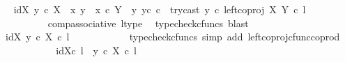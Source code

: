 \begin{isabellebody}
\ \isamarkupfalse%
\ {\isachardoublequoteopen}{\isachardot}{\kern0pt}{\isachardot}{\kern0pt}{\isachardot}{\kern0pt}\ {\isacharequal}{\kern0pt}\ {\isacharparenleft}{\kern0pt}{\isasymlangle}id{\isacharparenleft}{\kern0pt}X{\isacharparenright}{\kern0pt}{\isacharcomma}{\kern0pt}\ y{}\ {\isasymcirc}\isactrlsub c\ {\isasymbeta}\isactrlbsub X\isactrlesub {\isasymrangle}\ {\isasymamalg}\ {\isacharparenleft}{\kern0pt}{\isacharparenleft}{\kern0pt}{\isasymlangle}x{}{\isacharcomma}{\kern0pt}\ y{}{\isasymrangle}\ {\isasymamalg}\ {\isasymlangle}x{}\ {\isasymcirc}\isactrlsub c\ {\isasymbeta}\isactrlbsub Y\ {\isasymsetminus}\ {\isacharparenleft}{\kern0pt}{\isasymone}{\isacharcomma}{\kern0pt}y{}{\isacharparenright}{\kern0pt}\isactrlesub {\isacharcomma}{\kern0pt}\ y{}\isactrlsup c{\isasymrangle}{\isacharparenright}{\kern0pt}\ {\isasymcirc}\isactrlsub c\ \ try{\isacharunderscore}{\kern0pt}cast\ y{}{\isacharparenright}{\kern0pt}\ {\isasymcirc}\isactrlsub c\ left{\isacharunderscore}{\kern0pt}coproj\ X\ Y{\isacharparenright}{\kern0pt}\ {\isasymcirc}\isactrlsub c\ l{\isachardoublequoteclose}\isanewline
\ \ \ \ \ \ \ \ \ \ \isamarkupfalse%
\ comp{\isacharunderscore}{\kern0pt}associative{}\ l{\isacharunderscore}{\kern0pt}type\ \isamarkupfalse%
\ {\isacharparenleft}{\kern0pt}typecheck{\isacharunderscore}{\kern0pt}cfuncs{\isacharcomma}{\kern0pt}\ blast{\isacharparenright}{\kern0pt}\isanewline
\ \ \ \ \ \ \ \ \isamarkupfalse%
\ \isamarkupfalse%
\ {\isachardoublequoteopen}{\isachardot}{\kern0pt}{\isachardot}{\kern0pt}{\isachardot}{\kern0pt}\ {\isacharequal}{\kern0pt}\ {\isasymlangle}id{\isacharparenleft}{\kern0pt}X{\isacharparenright}{\kern0pt}{\isacharcomma}{\kern0pt}\ y{}\ {\isasymcirc}\isactrlsub c\ {\isasymbeta}\isactrlbsub X\isactrlesub {\isasymrangle}\ {\isasymcirc}\isactrlsub c\ l{\isachardoublequoteclose}\isanewline
\ \ \ \ \ \ \ \ \ \ \isamarkupfalse%
\ {\isacharparenleft}{\kern0pt}typecheck{\isacharunderscore}{\kern0pt}cfuncs{\isacharcomma}{\kern0pt}\ simp\ add{\isacharcolon}{\kern0pt}\ left{\isacharunderscore}{\kern0pt}coproj{\isacharunderscore}{\kern0pt}cfunc{\isacharunderscore}{\kern0pt}coprod{\isacharparenright}{\kern0pt}\isanewline
\ \ \ \ \ \ \ \ \isamarkupfalse%
\ \isamarkupfalse%
\ {\isachardoublequoteopen}{\isachardot}{\kern0pt}{\isachardot}{\kern0pt}{\isachardot}{\kern0pt}\ {\isacharequal}{\kern0pt}\ {\isasymlangle}id{\isacharparenleft}{\kern0pt}X{\isacharparenright}{\kern0pt}{\isasymcirc}\isactrlsub c\ l\ {\isacharcomma}{\kern0pt}\ {\isacharparenleft}{\kern0pt}y{}\ {\isasymcirc}\isactrlsub c\ {\isasymbeta}\isactrlbsub X\isactrlesub {\isacharparenright}{\kern0pt}\ {\isasymcirc}\isactrlsub c\ l{\isasymrangle}{\isachardoublequoteclose}\isanewline

\end{isabellebody}
